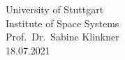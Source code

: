 \begin{titlepage}
\begin{center}
  \vspace{20mm}
         {\large \hspace{20mm} University of Stuttgart} \\
         {\large \hspace{20mm} Institute of Space Systems }\\
         {\large \hspace{20mm} Prof.\ Dr.\ Sabine Klinkner}\\
  \vspace{10mm}       
         {\large \hspace{20mm} 18.07.2021}
         
         
\end{center}
\end{titlepage}

\clearpage
\thispagestyle{empty}
\cleardoublepage





\newpage
